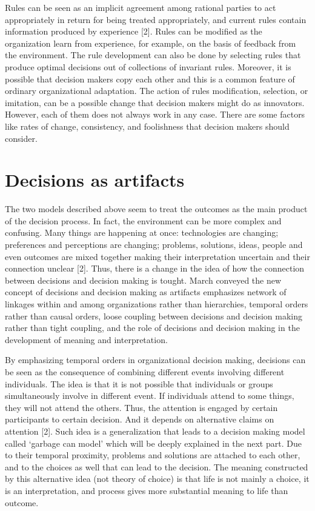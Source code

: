 Rules can be seen as an implicit agreement among rational parties to act appropriately in return for being treated appropriately, and current rules contain information produced by experience [2]. Rules can be modified as the organization learn from experience, for example, on the basis of feedback from the environment. The rule development can also be done by selecting rules that produce optimal decisions out of collections of invariant rules. Moreover, it is possible that decision makers copy each other and this is a common feature of ordinary organizational adaptation. The action of rules modification, selection, or imitation, can be a possible change that decision makers might do as innovators. However, each of them does not always work in any case. There are some factors like rates of change, consistency, and foolishness that decision makers should consider.

\section{Decisions as artifacts}

The two models described above seem to treat the outcomes as the main product of the decision process. In fact, the environment can be more complex and confusing. Many things are happening at once: technologies are changing; preferences and perceptions are changing; problems, solutions, ideas, people and even outcomes are mixed together making their interpretation uncertain and their connection unclear [2]. Thus, there is a change in the idea of how the connection between decisions and decision making is tought. March conveyed the new concept of decisions and decision making as artifacts emphasizes network of linkages within and among organizations rather than hierarchies, temporal orders rather than causal orders, loose coupling between decisions and decision making rather than tight coupling, and the role of decisions and decision making in the development of meaning and interpretation.

By emphasizing temporal orders in organizational decision making, decisions can be seen as the consequence of combining different events involving different individuals. The idea is that it is not possible that individuals or groups simultaneously involve in different event. If individuals attend to some things, they will not attend the others. Thus, the attention is engaged by certain participants to certain decision. And it depends on alternative claims on attention [2]. Such idea is a generalization that leads to a decision making model called ‘garbage can model’ which will be deeply explained in the next part. Due to their temporal proximity, problems and solutions are attached to each other, and to the choices as well that can lead to the decision. The meaning constructed by this alternative idea (not theory of choice) is that life is not mainly a choice, it is an interpretation, and process gives more substantial meaning to life than outcome.


